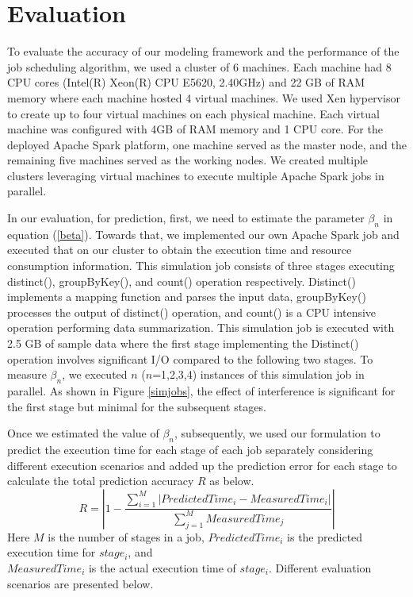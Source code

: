\section{Evaluation}
\label{evaluation}

\noindent
To evaluate the accuracy of our modeling framework and the performance of the job scheduling algorithm, we used a cluster of 6 machines. Each machine had 8 CPU cores (Intel(R) Xeon(R) CPU E5620, 2.40GHz) and 22 GB of RAM memory where each machine hosted 4 virtual machines. We used Xen hypervisor \cite{xen} to create up to four virtual machines on each physical machine. Each virtual machine was configured with 4GB of RAM memory and 1 CPU core. For the deployed Apache Spark platform, one machine served as the master node, and the remaining five machines served as the working nodes. We created multiple clusters leveraging virtual machines to execute multiple Apache Spark jobs in parallel. 


\noindent
In our evaluation, for prediction, first, we need to estimate the parameter $\beta_{n}$ in equation (\ref{beta}). Towards that, we implemented our own Apache Spark job and executed that on our cluster to obtain the execution time and resource consumption information. This simulation job consists of three stages executing distinct(), groupByKey(), and count() operation respectively. Distinct() implements a mapping function and parses the input data, groupByKey() processes the output of distinct() operation, and count() is a CPU intensive operation performing data summarization. This simulation job is executed with 2.5 GB of sample data where the first stage implementing the Distinct() operation involves significant I/O compared to the following two stages. To measure $\beta_{n}$, we executed $n$ ($n$=1,2,3,4) instances of this simulation job in parallel. As shown in Figure \ref{simjobs}, the effect of interference is significant for the first stage but minimal for the subsequent stages. 





\noindent
Once we estimated the value of $\beta_{n}$, subsequently, we used our formulation to predict the execution time for each stage of each job separately considering different execution scenarios and added up the prediction error for each stage to calculate the total prediction accuracy $R$ as below.
\begin{equation}
\label{predictaccuracy}
R = |1 -  \frac{\sum_{i=1}^{M}|PredictedTime_i - MeasuredTime_i|}{\sum_{j=1}^{M} MeasuredTime_{j}}|
\end{equation}
\noindent
Here $M$ is the number of stages in a job, $PredictedTime_i$ is the predicted execution time for $stage_i$, and \\
$MeasuredTime_i$ is the actual execution time of $stage_i$. Different evaluation scenarios are presented below.

